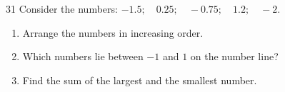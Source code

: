\clearpage
{}

\begin{probbox}{31}{\relax}
Consider the numbers: $-1.5;\quad 0.25;\quad -0.75;\quad 1.2;\quad -2$.
\begin{enumerate}[label=\alph*),leftmargin=1.6em,itemsep=0pt,topsep=2pt]
  \item Arrange the numbers in increasing order.
  \item Which numbers lie between $-1$ and $1$ on the number line?
  \item Find the sum of the largest and the smallest number.
\end{enumerate}
\end{probbox}
